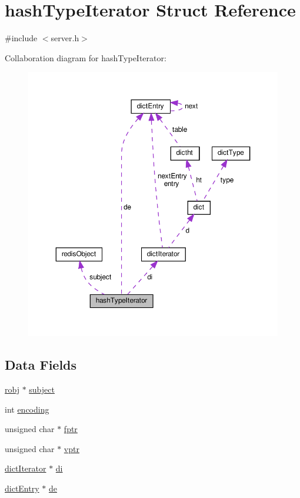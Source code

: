 \hypertarget{structhash_type_iterator}{}\section{hash\+Type\+Iterator Struct Reference}
\label{structhash_type_iterator}


{\ttfamily \#include $<$server.\+h$>$}



Collaboration diagram for hash\+Type\+Iterator\+:
\nopagebreak
\begin{figure}[H]
\begin{center}
\leavevmode
\includegraphics[width=350pt]{structhash_type_iterator__coll__graph}
\end{center}
\end{figure}
\subsection*{Data Fields}
\begin{DoxyCompactItemize}
\item 
\hyperlink{server_8h_a540f174d2685422fbd7d12e3cd44c8e2}{robj} $\ast$ \hyperlink{structhash_type_iterator_a8bd087874443f3e41cf5f728d8490693}{subject}
\item 
int \hyperlink{structhash_type_iterator_ad1b45f33065aae3c757f56a692b25741}{encoding}
\item 
unsigned char $\ast$ \hyperlink{structhash_type_iterator_a9deec0c53e9848ebf973fba86d4670a3}{fptr}
\item 
unsigned char $\ast$ \hyperlink{structhash_type_iterator_a5ead8d514dee29377ba31dc48066cb2c}{vptr}
\item 
\hyperlink{structdict_iterator}{dict\+Iterator} $\ast$ \hyperlink{structhash_type_iterator_a30e26ff2250d4d8b49241087d755342a}{di}
\item 
\hyperlink{structdict_entry}{dict\+Entry} $\ast$ \hyperlink{structhash_type_iterator_ad42c838fd43654444c8d4492319e1949}{de}
\end{DoxyCompactItemize}


